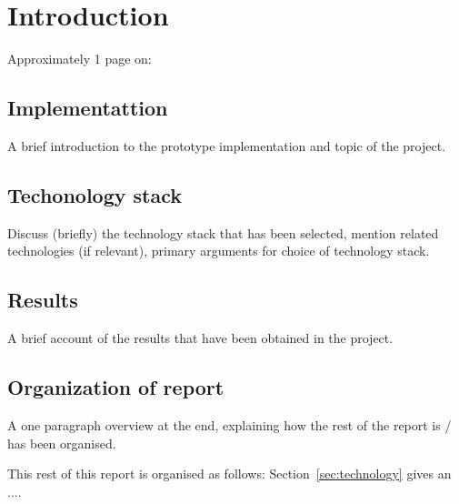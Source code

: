 \section{Introduction}
\label{sec:introduction}

Approximately 1 page on:

\subsection{Implementattion} A brief introduction to the prototype implementation and topic of the project.

\subsection{Techonology stack} Discuss (briefly) the technology stack that has been selected, mention related technologies (if relevant), primary arguments for choice of technology stack.

\subsection{Results} A brief account of the results that have been obtained in the project.

\subsection{Organization of report} A one paragraph overview at the end, explaining how the rest of the report is / has been organised.

\noindent
This rest of this report is organised as follows:
Section~\ref{sec:technology} gives an ....
